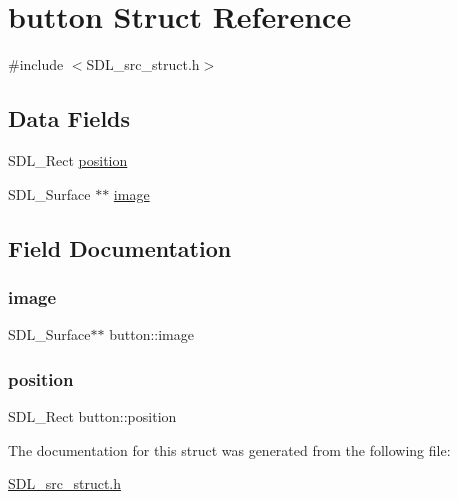 \hypertarget{structbutton}{}\section{button Struct Reference}
\label{structbutton}


{\ttfamily \#include $<$S\+D\+L\+\_\+src\+\_\+struct.\+h$>$}

\subsection*{Data Fields}
\begin{DoxyCompactItemize}
\item 
S\+D\+L\+\_\+\+Rect \mbox{\hyperlink{structbutton_a871c5f530b6eb0be33af2939d170d1ba}{position}}
\item 
S\+D\+L\+\_\+\+Surface $\ast$$\ast$ \mbox{\hyperlink{structbutton_a4e68c56f6e02d4cc64a320b5ef8e939f}{image}}
\end{DoxyCompactItemize}


\subsection{Field Documentation}
\mbox{\label{structbutton_a4e68c56f6e02d4cc64a320b5ef8e939f}} 
\subsubsection{\texorpdfstring{image}{image}}
{\footnotesize\ttfamily S\+D\+L\+\_\+\+Surface$\ast$$\ast$ button\+::image}

\mbox{\label{structbutton_a871c5f530b6eb0be33af2939d170d1ba}} 
\subsubsection{\texorpdfstring{position}{position}}
{\footnotesize\ttfamily S\+D\+L\+\_\+\+Rect button\+::position}



The documentation for this struct was generated from the following file\+:\begin{DoxyCompactItemize}
\item 
\mbox{\hyperlink{SDL__src__struct_8h}{S\+D\+L\+\_\+src\+\_\+struct.\+h}}\end{DoxyCompactItemize}
